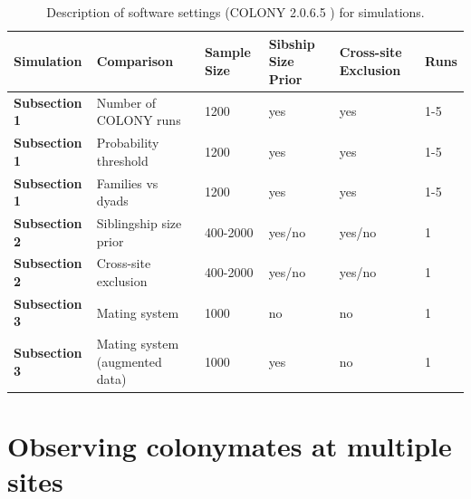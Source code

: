 \documentclass[12pt]{article}
\begin{document}
\begin{table}
\centering
\caption{Description of software settings (COLONY 2.0.6.5 \parencite{jonesCOLONYProgramParentage2010}) for simulations.}
\label{tab:simulationspecs}
\footnotesize
\begin{tabular}{ p{2cm}  p{3.5cm} p{2cm} p{2.5cm} p{2cm} p{1.5cm}}
\hline
\textbf{Simulation}& \textbf{Comparison}&\textbf{Sample Size}& \textbf{Sibship Size Prior}& \textbf{Cross-site Exclusion}& \textbf{Runs}\\
\hline
\textbf{Subsection 1} & Number of COLONY runs& 1200 & yes& yes& 1-5 \\
\hline
\textbf{Subsection 1} & Probability threshold& 1200 & yes & yes & 1-5  \\
\hline
\textbf{Subsection 1} & Families vs dyads & 1200 & yes& yes& 1-5\\
\hline
\textbf{Subsection 2} & Siblingship size prior & 400-2000 & yes/no & yes/no& 1 \\
\hline
\textbf{Subsection 2} & Cross-site exclusion & 400-2000 & yes/no & yes/no& 1\\
\hline
\textbf{Subsection 3} & Mating system& 1000 & no & no& 1 \\
   \hline  
\textbf{Subsection 3} & Mating system (augmented data)& 1000 & yes & no& 1 \\
   \hline  
\end{tabular}
\end{table}





\section{Observing colonymates at multiple sites}
\end{document}
